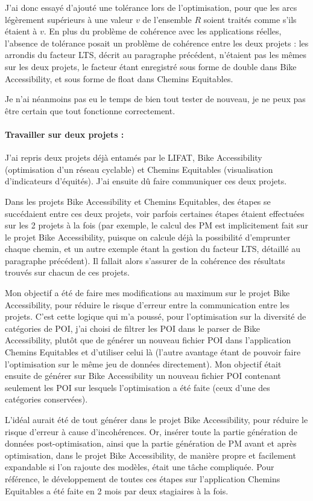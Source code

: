 J'ai donc essayé d'ajouté une tolérance lors de l'optimisation, pour que les arcs légèrement supérieurs à une valeur $v$ de l'ensemble $R$ soient traités comme s'ils étaient à $v$. En plus du problème de cohérence avec les applications réelles, l'absence de tolérance posait un problème de cohérence entre les deux projets : les arrondis du facteur LTS, décrit au paragraphe précédent, n'étaient pas les mêmes sur les deux projets, le facteur étant enregistré sous forme de double dans Bike Accessibility, et sous forme de float dans Chemins Equitables.

Je n'ai néanmoins pas eu le temps de bien tout tester de nouveau, je ne peux pas être certain que tout fonctionne correctement.

\paragraph{Travailler sur deux projets :}

J'ai repris deux projets déjà entamés par le LIFAT, Bike Accessibility (optimisation d'un réseau cyclable) et Chemins Equitables (visualisation d'indicateurs d'équités). J'ai ensuite dû faire communiquer ces deux projets. 

Dans les projets Bike Accessibility et Chemins Equitables, des étapes se succédaient entre ces deux projets, voir parfois certaines étapes étaient effectuées sur les 2 projets à la fois (par exemple, le calcul des PM est implicitement fait sur le projet Bike Accessibility, puisque on calcule déjà la possibilité d'emprunter chaque chemin, et un autre exemple étant la gestion du facteur LTS, détaillé au paragraphe précédent). Il fallait alors s'assurer de la cohérence des résultats trouvés sur chacun de ces projets. 

Mon objectif a été de faire mes modifications au maximum sur le projet Bike Accessibility, pour réduire le risque d'erreur entre la communication entre les projets. C'est cette logique qui m'a poussé, pour l'optimisation sur la diversité de catégories de POI, j'ai choisi de filtrer les POI dans le parser de Bike Accessibility, plutôt que de générer un nouveau fichier POI dans l'application Chemins Equitables et d'utiliser celui là (l'autre avantage étant de pouvoir faire l'optimisation sur le même jeu de données directement). Mon objectif était ensuite de générer sur Bike Accessibility un nouveau fichier POI contenant seulement les POI sur lesquels l'optimisation a été faite (ceux d'une des catégories conservées).

L'idéal aurait été de tout générer dans le projet Bike Accessibility, pour réduire le risque d'erreur à cause d'incohérences. Or, insérer toute la partie génération de données post-optimisation, ainsi que la partie génération de PM avant et après optimisation, dans le projet Bike Accessibility, de manière propre et facilement expandable si l'on rajoute des modèles, était une tâche compliquée. Pour référence, le développement de toutes ces étapes sur l'application Chemins Equitables a été faite en 2 mois par deux stagiaires à la fois.

